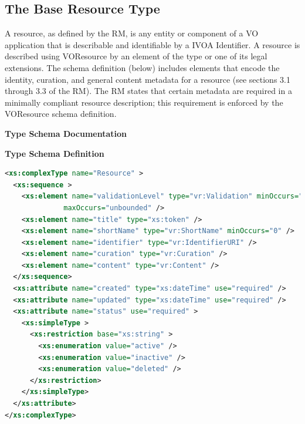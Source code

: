 \documentclass[11pt,a4paper]{ivoa}
\begin{document}
\subsection{The Base Resource Type}

\label{sect:restype}

A resource, as defined by the RM, is any entity or component of a VO
application that is describable and identifiable by a IVOA Identifier.
A resource is described using VOResource by an element of the type
 or one of its legal extensions.  The schema
definition (below) includes elements that encode the identity, curation,
and general content metadata for a resource (see sections 3.1 through
3.3 of the RM).  The RM states that certain metadata are required in a
minimally compliant resource description; this requirement is enforced
by the VOResource schema definition.  

\begingroup
      	\renewcommand*\descriptionlabel[1]{%
      	\hbox to 5.5em{\emph{#1}\hfil}}\vspace{2ex}\noindent\textbf{ Type Schema Documentation}


\vspace{1ex}\noindent\textbf{ Type Schema Definition}

\begin{lstlisting}[language=XML,basicstyle=\footnotesize]
<xs:complexType name="Resource" >
  <xs:sequence >
    <xs:element name="validationLevel" type="vr:Validation" minOccurs="0"
              maxOccurs="unbounded" />
    <xs:element name="title" type="xs:token" />
    <xs:element name="shortName" type="vr:ShortName" minOccurs="0" />
    <xs:element name="identifier" type="vr:IdentifierURI" />
    <xs:element name="curation" type="vr:Curation" />
    <xs:element name="content" type="vr:Content" />
  </xs:sequence>
  <xs:attribute name="created" type="xs:dateTime" use="required" />
  <xs:attribute name="updated" type="xs:dateTime" use="required" />
  <xs:attribute name="status" use="required" >
    <xs:simpleType >
      <xs:restriction base="xs:string" >
        <xs:enumeration value="active" />
        <xs:enumeration value="inactive" />
        <xs:enumeration value="deleted" />
      </xs:restriction>
    </xs:simpleType>
  </xs:attribute>
</xs:complexType>
\end{lstlisting}
\end{document}
